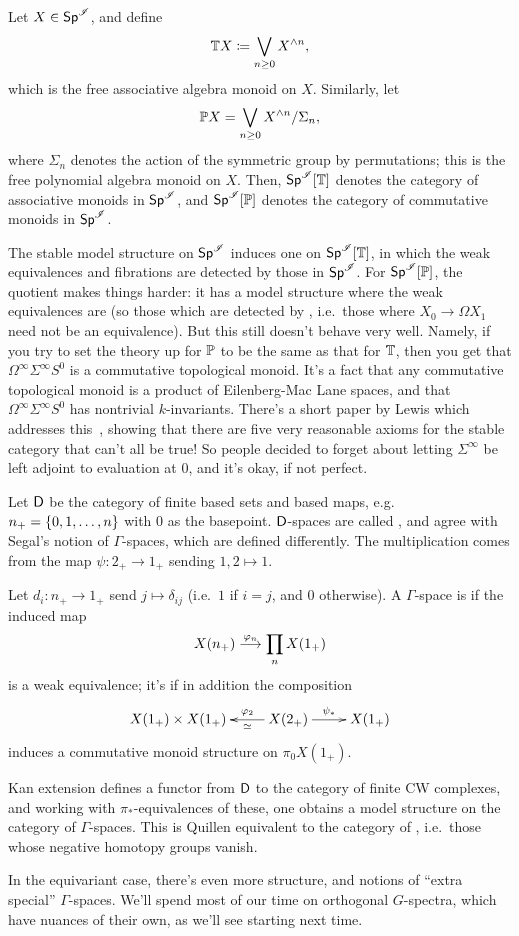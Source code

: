 Let $X\in\Spc^\sI$, and define
\[\T X\coloneqq\bigvee_{n\ge 0} X^{\wedge n},\]
which is the free associative algebra monoid on $X$. Similarly, let
\[\P X = \bigvee_{n\ge 0} X^{\wedge n}/\Sigma_n,\]
where $\Sigma_n$ denotes the action of the symmetric group by permutations; this is the free polynomial algebra
monoid on $X$. Then, $\Spc^\sI[\T]$ denotes the category of associative monoids in $\Spc^\sI$, and $\Spc^\sI[\P]$
denotes the category of commutative monoids in $\Spc^\sI$.

The stable model structure on $\Spc^\sI$ induces one on $\Spc^\sI[\T]$, in which the weak equivalences and
fibrations are detected by those in $\Spc^\sI$. For $\Spc^\sI[\P]$, the quotient makes things harder: it has a
model structure where the weak equivalences are  (so those which are detected by
, i.e.\ those where $X_0\to\Omega X_1$ need not be an equivalence). But this still
doesn't behave very well. Namely, if you try to set the theory up for $\P$ to be the same as that for $\T$, then
you get that $\Omega^\infty\Sigma^\infty S^0$ is a commutative topological monoid. It's a fact that any commutative
topological monoid is a product of Eilenberg-Mac Lane spaces, and that $\Omega^\infty\Sigma^\infty S^0$ has
nontrivial $k$-invariants. There's a short paper by Lewis which addresses this~\cite{Lewis91}, showing that there
are five very reasonable axioms for the stable category that can't all be true! So people decided to forget about
letting $\Sigma^\infty$ be left adjoint to evaluation at $0$, and it's okay, if not perfect.
\begin{exm}
\label{gamma_spaces}
Let $\fD$ be the category of finite based sets and based maps, e.g.\ $n_+ = \set{0,1,\dotsc,n}$ with $0$ as the
basepoint. $\fD$-spaces are called , and agree with Segal's notion of $\Gamma$-spaces, which
are defined differently. The multiplication comes from the map $\psi\colon 2_+\to 1_+$ sending $1,2\mapsto 1$.

Let $d_i:n_+\to 1_+$ send $j\mapsto\delta_{ij}$ (i.e.\ $1$ if $i = j$, and $0$ otherwise). A $\Gamma$-space is
 if the induced map
\[X(n_+)\stackrel{\vp_n}{\longrightarrow} \prod_n X(1_+)\]
is a weak equivalence; it's  if in addition the composition
\[\xymatrix{
	X(1_+)\times X(1_+) & X(2_+)\ar[l]^-\simeq_-{\vp_2}\ar[r]^{\psi_*} &X(1_+)
}\]
induces a commutative monoid structure on $\pi_0 X(1_+)$.

Kan extension defines a functor from $\fD$ to the category of finite CW complexes, and working with
$\pi_*$-equivalences of these, one obtains a model structure on the category of $\Gamma$-spaces. This is Quillen
equivalent to the category of , i.e.\ those whose negative homotopy groups vanish.
\end{exm}
In the equivariant case, there's even more structure, and notions of ``extra special'' $\Gamma$-spaces. We'll spend
most of our time on orthogonal $G$-spectra, which have nuances of their own, as we'll see starting next time.
